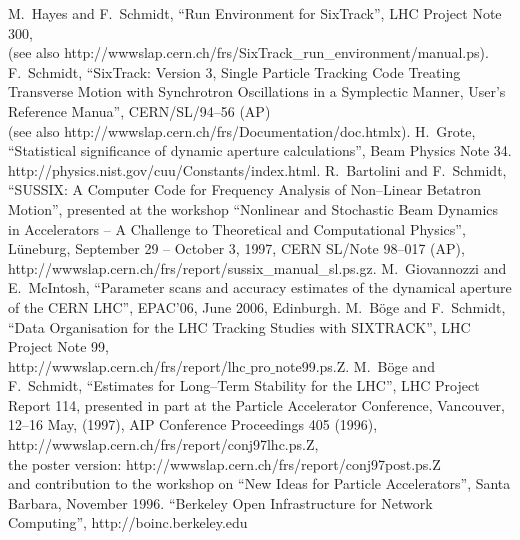 \documentclass{cernatsnote}    %
\begin{document}
\begin{thebibliography}{99}
%
 M.~Hayes and F.~Schmidt, ``Run Environment for SixTrack'',
  LHC Project Note 300,\\
  (see also http://wwwslap.cern.ch/frs/SixTrack\_run\_environment/manual.ps).
%
 F.~Schmidt, ``SixTrack: Version 3, Single Particle
  Tracking Code Treating Transverse Motion with Synchrotron
  Oscillations in a Symplectic Manner, User's Reference Manua'',
  CERN/SL/94--56 (AP)\\
  (see also http://wwwslap.cern.ch/frs/Documentation/doc.htmlx).
%
 H.~Grote, ``Statistical significance of dynamic
  aperture calculations'', Beam Physics Note 34.
%
 
  {http://physics.nist.gov/cuu/Constants/index.html}.
%
 R.~Bartolini and F.~Schmidt, ``SUSSIX: A Computer
  Code for Frequency Analysis of Non--Linear Betatron Motion'',
  presented at the workshop ``Nonlinear and Stochastic Beam Dynamics
  in Accelerators -- A Challenge to Theoretical and Computational
  Physics'', L\"uneburg, September 29 -- October 3, 1997, CERN SL/Note
  98--017 (AP),
  {http://wwwslap.cern.ch/frs/report/sussix\_manual\_sl.ps.gz}.
%
M.~Giovannozzi and E.~McIntosh, ``Parameter scans and accuracy estimates
of the dynamical aperture of the CERN LHC'', EPAC'06, June 2006, Edinburgh.
%
 M.~B\"oge and F.~Schmidt, ``Data Organisation for
  the LHC Tracking Studies with SIXTRACK'', LHC Project Note 99,\\
  {http://wwwslap.cern.ch/frs/report/lhc$\_$pro$\_$note99.ps.Z}.
%
 M.~B\"oge and F.~Schmidt, ``Estimates for Long--Term
  Stability for the LHC'', LHC Project Report 114, presented in part
  at the Particle Accelerator Conference, Vancouver, 12--16 May,
  (1997), AIP Conference Proceedings 405 (1996),
  {http://wwwslap.cern.ch/frs/report/conj97lhc.ps.Z},\\
  the poster version:
  {http://wwwslap.cern.ch/frs/report/conj97post.ps.Z} \\
  and contribution to the workshop on ``New Ideas for Particle
  Accelerators'', Santa Barbara, November 1996.
%
 ``Berkeley Open Infrastructure for Network Computing'',
   http://boinc.berkeley.edu
\end{thebibliography}

\clearpage
\end{document}
